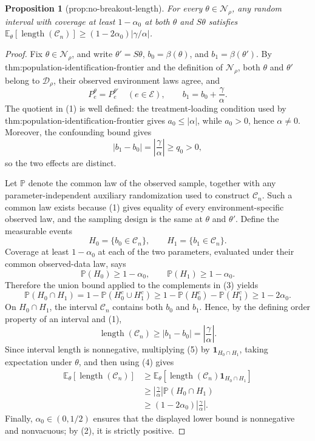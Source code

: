 \documentclass{article}
\newtheorem{proposition}{Proposition}
\begin{document}
\begin{proposition}[prop:no-breakout-length]\label{prop:no-breakout-length}
For every \(\theta\in\mathcal N_\rho\), any random interval with coverage at least \(1-\alpha_0\) at both \(\theta\) and \(S\theta\) satisfies \(\mathbb E_\theta[\operatorname{length}(\mathcal C_n)]\ge(1-2\alpha_0)\lvert\gamma/\alpha\rvert\).
\end{proposition}
\begin{proof}
Fix \(\theta\in\mathcal N_\rho\), and write \(\theta'=S\theta\), \(b_0=\beta(\theta)\), and \(b_1=\beta(\theta')\).  By \(\text{thm:population-identification-frontier}\) and the definition of \(\mathcal N_\rho\), both \(\theta\) and \(\theta'\) belong to \(\mathcal D_\rho\), their observed environment laws agree, and
\[
 P_e^{\theta}=P_e^{\theta'}\quad(e\in\mathcal E),
 \qquad
 b_1=b_0+\frac{\gamma}{\alpha}.
 \tag{1}
\]
The quotient in (1) is well defined: the treatment-loading condition used by \(\text{thm:population-identification-frontier}\) gives \(a_0\leq |\alpha|\), while \(a_0>0\), hence \(\alpha\neq0\).  Moreover, the confounding bound gives
\[
 \left|b_1-b_0\right|=\left|\frac{\gamma}{\alpha}\right|\geq q_0>0,
 \tag{2}
\]
so the two effects are distinct.

Let \(\mathbb P\) denote the common law of the observed sample, together with any parameter-independent auxiliary randomization used to construct \(\mathcal C_n\).  Such a common law exists because (1) gives equality of every environment-specific observed law, and the sampling design is the same at \(\theta\) and \(\theta'\).  Define the measurable events
\[
 H_0=\{b_0\in\mathcal C_n\},
 \qquad
 H_1=\{b_1\in\mathcal C_n\}.
\]
Coverage at least \(1-\alpha_0\) at each of the two parameters, evaluated under their common observed-data law, says
\[
 \mathbb P(H_0)\geq1-\alpha_0,
 \qquad
 \mathbb P(H_1)\geq1-\alpha_0.
 \tag{3}
\]
Therefore the union bound applied to the complements in (3) yields
\[
 \mathbb P(H_0\cap H_1)
 =1-\mathbb P(H_0^c\cup H_1^c)
 \geq1-\mathbb P(H_0^c)-\mathbb P(H_1^c)
 \geq1-2\alpha_0.
 \tag{4}
\]
On \(H_0\cap H_1\), the interval \(\mathcal C_n\) contains both \(b_0\) and \(b_1\).  Hence, by the defining order property of an interval and (1),
\[
 \operatorname{length}(\mathcal C_n)
 \geq |b_1-b_0|
 =\left|\frac{\gamma}{\alpha}\right|.
 \tag{5}
\]
Since interval length is nonnegative, multiplying (5) by \(\mathbf 1_{H_0\cap H_1}\), taking expectation under \(\theta\), and then using (4) gives
\[
 \begin{aligned}
 \mathbb E_\theta\!\left[\operatorname{length}(\mathcal C_n)\right]
 &\geq
 \mathbb E_\theta\!\left[
   \operatorname{length}(\mathcal C_n)\mathbf 1_{H_0\cap H_1}
 \right]\\
 &\geq
 \left|\frac{\gamma}{\alpha}\right|
 \mathbb P(H_0\cap H_1)\\
 &\geq
 (1-2\alpha_0)\left|\frac{\gamma}{\alpha}\right|.
 \end{aligned}
\]
Finally, \(\alpha_0\in(0,1/2)\) ensures that the displayed lower bound is nonnegative and nonvacuous; by (2), it is strictly positive.
\end{proof}
\end{document}
